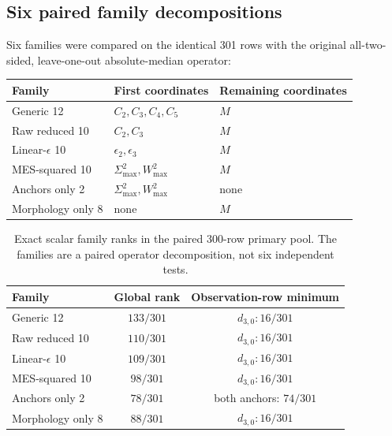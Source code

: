\documentclass[11pt,a4paper]{article}
\begin{document}
\subsection{Six paired family decompositions}

Six families were compared on the identical 301 rows with the original
all-two-sided, leave-one-out absolute-median operator:
\begin{center}
\small
\begin{tabular}{@{}lll@{}}
\toprule
Family & First coordinates & Remaining coordinates\\
\midrule
Generic 12 & $C_2,C_3,C_4,C_5$ & $M$\\
Raw reduced 10 & $C_2,C_3$ & $M$\\
Linear-$\epsilon$ 10 & $\epsilon_2,\epsilon_3$ & $M$\\
MES-squared 10 & $\Sigma^2_{\max},W^2_{\max}$ & $M$\\
Anchors only 2 & $\Sigma^2_{\max},W^2_{\max}$ & none\\
Morphology only 8 & none & $M$\\
\bottomrule
\end{tabular}
\end{center}

\begin{table}[H]
\centering
\small
\caption{Exact scalar family ranks in the paired 300-row primary pool.  The
families are a paired operator decomposition, not six independent tests.}
\label{tab:scalar-family-ranks}
\begin{tabular}{@{}lcc@{}}
\toprule
Family & Global rank & Observation-row minimum\\
\midrule
Generic 12 & $133/301$ & $d_{3,0}:16/301$\\
Raw reduced 10 & $110/301$ & $d_{3,0}:16/301$\\
Linear-$\epsilon$ 10 & $109/301$ & $d_{3,0}:16/301$\\
MES-squared 10 & $98/301$ & $d_{3,0}:16/301$\\
Anchors only 2 & $78/301$ & both anchors: $74/301$\\
Morphology only 8 & $88/301$ & $d_{3,0}:16/301$\\
\bottomrule
\end{tabular}
\end{table}
\end{document}

